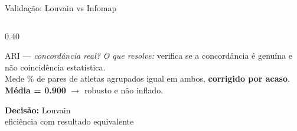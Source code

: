 \begin{frame}[shrink=12]{Validação: Louvain \cite{Blondel2008Louvain} vs Infomap \cite{Rosvall2008Infomap}}
\begin{columns}[T]
\begin{column}{0.40\textwidth}
            \vspace{0.15cm}

            \begin{block}{ARI \cite{Vinh2010NMI} --- \textit{concordância real?}}
                \footnotesize
                \textit{O que resolve:} verifica se a concordância é genuína e não coincidência estatística.\\
                Mede \% de pares de atletas agrupados igual em ambos, \textbf{corrigido por acaso}.\\
                \textbf{Média = 0.900} $\rightarrow$ robusto e não inflado.
            \end{block}

            \vspace{0.15cm}

            \begin{alertblock}{}
                \footnotesize\centering
                \textbf{Decisão:} Louvain\\eficiência com resultado equivalente
            \end{alertblock}
        \end{column}
    \end{columns}
\end{frame}


